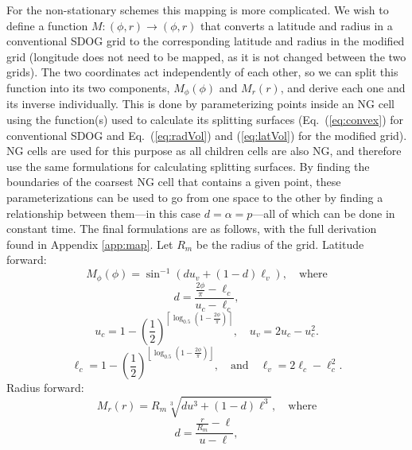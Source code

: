 For the non-stationary schemes this mapping is more complicated.
We wish to define a function $M \colon (\phi, r) \rightarrow (\phi, r)$ that converts a latitude and radius in a conventional SDOG grid to the corresponding latitude and radius in the modified grid (longitude does not need to be mapped, as it is not changed between the two grids).
The two coordinates act independently of each other, so we can split this function into its two components, $M_{\phi}(\phi)$ and $M_{r}(r)$, and derive each one and its inverse individually.
This is done by parameterizing points inside an NG cell using the function(s) used to calculate its splitting surfaces (Eq.~(\ref{eq:convex}) for conventional SDOG and Eq.~(\ref{eq:radVol}) and (\ref{eq:latVol}) for the modified grid).
NG cells are used for this purpose as all children cells are also NG, and therefore use the same formulations for calculating splitting surfaces.
By finding the boundaries of the coarsest NG cell that contains a given point, these parameterizations can be used to go from one space to the other by finding a relationship between them---in this case $d = \alpha = p$---all of which can be done in constant time.
The final formulations are as follows, with the full derivation found in Appendix \ref{app:map}.
Let $R_m$ be the radius of the grid.
Latitude forward:
%
\begin{equation*}
M_{\phi}(\phi) = \sin^{-1} \left( d u_{v} + \left( 1 - d \right) \ell_{v} \right), \quad \text{where}
\end{equation*}
%
\begin{equation*}
d = \frac{\frac{2\phi}{\pi} - \ell_{c}}{u_{c} - \ell_{c}},
\end{equation*}
%
\begin{equation*}
u_{c} = 1 - \left( \frac{1}{2} \right)^{ \left\lceil \log_{0.5} \left( 1 - \frac{2\phi}{\pi} \right) \right\rceil }, \quad u_{v} = 2 u_{c} - u_{c}^{2}.
\end{equation*}
%
\begin{equation*}
\ell_{c} = 1 - \left( \frac{1}{2} \right)^{ \left\lfloor \log_{0.5} \left( 1 - \frac{2\phi}{\pi} \right) \right\rfloor }, \quad \text{and} \quad \ell_{v} = 2 \ell_{c} - \ell_{c}^{2}.
\end{equation*}
%
%
Radius forward:
%
\begin{equation*}
M_{r}(r) = R_{m} \sqrt[3]{ d u^{3} + \left( 1 - d \right) \ell^{3} }, \quad \text{where}
\end{equation*}
%
\begin{equation*}
d = \frac{\frac{r}{R_{m}} - \ell}{u - \ell},
\end{equation*}
